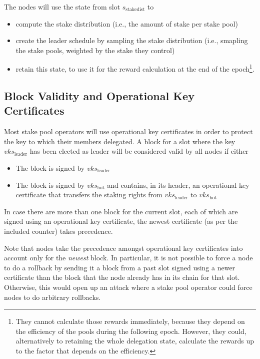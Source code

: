 \documentclass[11pt,a4paper]{article}
\begin{document}
The nodes will use the state from slot \(s_\text{stakedist}\) to
\begin{itemize}
\item compute the stake distribution (i.e., the amount of stake per
  stake pool)
\item create the leader schedule by sampling the stake distribution
  (i.e., smapling the stake pools, weighted by the stake they control)
\item retain this state, to use it for the reward calculation at the
  end of the epoch\footnote{They cannot calculate those rewards
    immediately, because they depend on the efficiency of the pools
    during the following epoch. However, they could, alternatively to
    retaining the whole delegation state, calculate the rewards up to
    the factor that depends on the efficiency.}.
\end{itemize}

\subsection{Block Validity and Operational Key Certificates}
\label{block-validity-and-operational-key-certificates}

Most stake pool operators will use operational key certificates in order to
protect the key to which their members delegated. A block for a slot
where the key \(vks_\text{leader}\) has been elected as leader will be
considered valid by all nodes if either

\begin{itemize}
\item
  The block is signed by \(vks_\text{leader}\)
\item
  The block is signed by \(vks_\text{hot}\) and contains, in its header,
  an operational key certificate that transfers the staking rights from
  \(vks_\text{leader}\) to \(vks_\text{hot}\)
\end{itemize}

In case there are more than one block for the current slot, each of
which are signed using an operational key certificate, the newest certificate
(as per the included counter) takes precedence.

Note that nodes take the precedence amongst operational key certificates
into account only for the \emph{newest} block. In particular, it is
not possible to force a node to do a rollback by sending it a block
from a past slot signed using a newer certificate than the block that
the node already has in its chain for that slot. Otherwise, this would
open up an attack where a stake pool operator could force nodes to do
arbitrary rollbacks.
\end{document}
